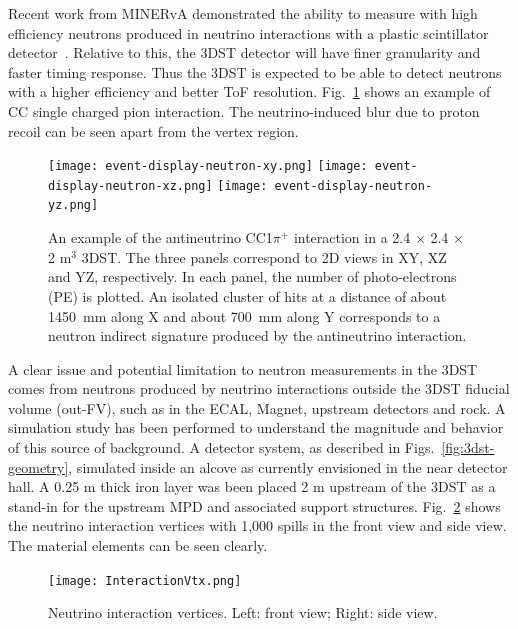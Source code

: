 Recent work from MINERvA demonstrated 
 the ability to measure with high efficiency neutrons produced in neutrino interactions with a plastic scintillator detector~\cite{minerva-neutron-paper}. Relative to this,
the 3DST detector will have finer granularity and faster timing response. Thus the 3DST is expected to be able to detect neutrons with a higher efficiency and better ToF resolution.
Fig.~\ref{fig:NeutronDisplay} shows an example of
CC single charged pion interaction. The neutrino-induced blur due to proton recoil can be seen apart from the vertex region. 
\begin{figure}
\begin{center}
  \texttt{[image: event-display-neutron-xy.png]}
  \texttt{[image: event-display-neutron-xz.png]}
  \texttt{[image: event-display-neutron-yz.png]}
\caption{\label{fig:NeutronDisplay} An example of the antineutrino CC1$\pi^{+}$ interaction in a 2.4 $\times$ 2.4 $\times$ 2 m$^{3}$ 3DST. The three panels correspond to 2D views in XY, XZ and YZ, respectively. In each panel, the number of photo-electrons (PE) is plotted.
An isolated cluster of hits at a distance of about 1450~mm along X and about 700~mm along Y corresponds to a neutron indirect signature produced by the antineutrino interaction. } 
\end{center}
\end{figure}

A clear issue and potential limitation to neutron measurements in the 3DST comes from neutrons produced by neutrino interactions outside the 3DST fiducial volume (out-FV), such as in the ECAL, Magnet, upstream detectors and rock. 
A simulation study has been performed to understand the magnitude and behavior of this source of background. A detector system, as described in Figs.~\ref{fig:3dst-geometry}, %
simulated inside an alcove as currently envisioned in the near detector hall.  
A 0.25 m thick iron layer was been placed 2 m upstream of the 3DST as a stand-in for the upstream MPD and associated support structures. Fig.~\ref{fig:InteractionVtx} shows the neutrino interaction vertices with 1,000 spills in the front view and side view. The material elements can be seen clearly. 
\begin{figure}
\begin{center}
  \texttt{[image: InteractionVtx.png]}
\caption{\label{fig:InteractionVtx} Neutrino interaction vertices. Left: front view; Right: side view. } 
\end{center}
\end{figure}

